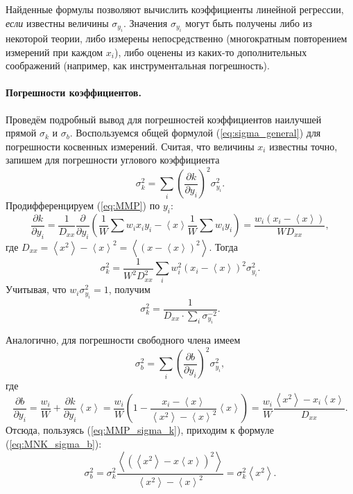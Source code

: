 Найденные формулы позволяют вычислить коэффициенты линейной
регрессии, \emph{если} известны величины $\sigma_{y_{i}}$.
Значения $\sigma_{y_{i}}$ могут быть получены либо из некоторой теории,
либо измерены непосредственно (многократным повторением измерений
при каждом $x_{i}$), либо оценены из каких-то дополнительных соображений
(например, как инструментальная погрешность).

\paragraph{Погрешности коэффициентов.}

Проведём подробный вывод для погрешностей коэффициентов наилучшей
прямой $\sigma_{k}$ и $\sigma_{b}$. Воспользуемся общей формулой
(\ref{eq:sigma_general}) для погрешности косвенных измерений. Считая,
что величины $x_{i}$ известны точно, запишем для погрешности углового
коэффициента
\[
\sigma_{k}^{2}=\sum\limits _{i}\left(\frac{\partial k}{\partial y_{i}}\right)^{2}\sigma_{y_{i}}^{2}.
\]
Продифференцируем (\ref{eq:MMP}) по $y_{i}$:
\[
\frac{\partial k}{\partial y_{i}}=\frac{1}{D_{xx}}\frac{\partial}{\partial y_{i}}\left(\frac{1}{W}\sum w_{i}x_{i}y_{i}-\left\langle x\right\rangle \frac{1}{W}\sum w_{i}y_{i}\right)=\frac{w_{i}\left(x_{i}-\left\langle x\right\rangle \right)}{WD_{xx}},
\]
где $D_{xx}=\left\langle x^{2}\right\rangle -\left\langle x\right\rangle ^{2}=\left\langle (x-\left\langle x\right\rangle )^{2}\right\rangle $.
Тогда
\[
\sigma_{k}^{2}=\frac{1}{W^{2}D_{xx}^{2}}\sum\limits _{i}w_{i}^{2}\left(x_{i}-\left\langle x\right\rangle \right)^{2}\sigma_{y_{i}}^{2}.
\]
Учитывая, что $w_{i}\sigma_{y_{i}}^{2}=1$, получим
\begin{equation}
\boxed{\sigma_{k}^{2}=\frac{1}{D_{xx}\cdot\sum\limits _{i}\sigma_{y_{i}}^{-2}}}.\label{eq:MMP_sigma_k}
\end{equation}

Аналогично, для погрешности свободного члена имеем
\[
\sigma_{b}^{2}=\sum_{i}\left(\frac{\partial b}{\partial y_{i}}\right)^{2}\sigma_{y_{i}}^{2},
\]
где 
\[
\frac{\partial b}{\partial y_{i}}=\frac{w_{i}}{W}+\frac{\partial k}{\partial y_{i}}\left\langle x\right\rangle =\frac{w_{i}}{W}\left(1-\frac{x_{i}-\left\langle x\right\rangle }{\left\langle x^{2}\right\rangle -\left\langle x\right\rangle ^{2}}\left\langle x\right\rangle \right)=\frac{w_{i}}{W}\frac{\left\langle x^{2}\right\rangle -x_{i}\left\langle x\right\rangle }{D_{xx}}.
\]
Отсюда, пользуясь (\ref{eq:MMP_sigma_k}), приходим к формуле (\ref{eq:MNK_sigma_b}):
\[
\sigma_{b}^{2}=\sigma_{k}^{2}\frac{\left\langle \left(\left\langle x^{2}\right\rangle -x\left\langle x\right\rangle \right)^{2}\right\rangle }{\left\langle x^{2}\right\rangle -\left\langle x\right\rangle ^{2}}=\sigma_{k}^{2}\left\langle x^{2}\right\rangle .
\]

